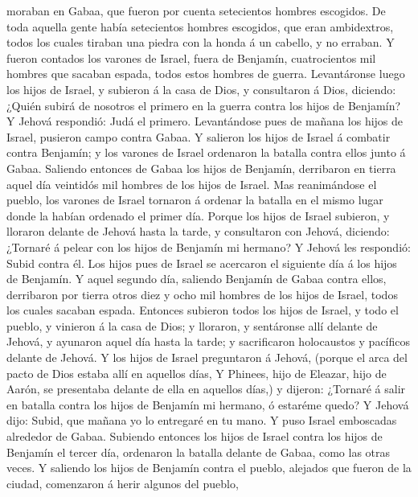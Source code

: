 moraban en Gabaa, que fueron por cuenta setecientos hombres escogidos.
 De toda aquella gente había setecientos hombres escogidos,
que eran ambidextros, todos los cuales tiraban una piedra con la honda á
un cabello, y no erraban.  Y fueron contados los varones de
Israel, fuera de Benjamín, cuatrocientos mil hombres que sacaban espada,
todos estos hombres de guerra.  Levantáronse luego los
hijos de Israel, y subieron á la casa de Dios, y consultaron á Dios,
diciendo: ¿Quién subirá de nosotros el primero en la guerra contra los
hijos de Benjamín? Y Jehová respondió: Judá el primero. 
Levantándose pues de mañana los hijos de Israel, pusieron campo contra
Gabaa.  Y salieron los hijos de Israel á combatir contra
Benjamín; y los varones de Israel ordenaron la batalla contra ellos
junto á Gabaa.  Saliendo entonces de Gabaa los hijos de
Benjamín, derribaron en tierra aquel día veintidós mil hombres de los
hijos de Israel.  Mas reanimándose el pueblo, los varones
de Israel tornaron á ordenar la batalla en el mismo lugar donde la
habían ordenado el primer día.  Porque los hijos de Israel
subieron, y lloraron delante de Jehová hasta la tarde, y consultaron con
Jehová, diciendo: ¿Tornaré á pelear con los hijos de Benjamín mi
hermano? Y Jehová les respondió: Subid contra él.  Los
hijos pues de Israel se acercaron el siguiente día á los hijos de
Benjamín.  Y aquel segundo día, saliendo Benjamín de Gabaa
contra ellos, derribaron por tierra otros diez y ocho mil hombres de los
hijos de Israel, todos los cuales sacaban espada.  Entonces
subieron todos los hijos de Israel, y todo el pueblo, y vinieron á la
casa de Dios; y lloraron, y sentáronse allí delante de Jehová, y
ayunaron aquel día hasta la tarde; y sacrificaron holocaustos y
pacíficos delante de Jehová.  Y los hijos de Israel
preguntaron á Jehová, (porque el arca del pacto de Dios estaba allí en
aquellos días,  Y Phinees, hijo de Eleazar, hijo de Aarón,
se presentaba delante de ella en aquellos días,) y dijeron: ¿Tornaré á
salir en batalla contra los hijos de Benjamín mi hermano, ó estaréme
quedo? Y Jehová dijo: Subid, que mañana yo lo entregaré en tu mano.
 Y puso Israel emboscadas alrededor de Gabaa. 
Subiendo entonces los hijos de Israel contra los hijos de Benjamín el
tercer día, ordenaron la batalla delante de Gabaa, como las otras veces.
 Y saliendo los hijos de Benjamín contra el pueblo,
alejados que fueron de la ciudad, comenzaron á herir algunos del pueblo,
